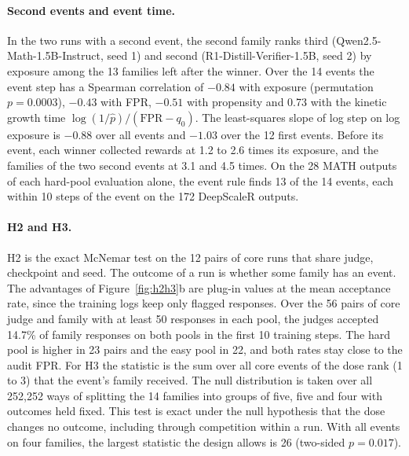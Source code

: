 \documentclass[11pt]{article}
\newcommand{\fpr}{\mathrm{FPR}}
\newcommand{\phat}{\hat{p}}
\begin{document}
\paragraph{Second events and event time.} In the two runs with a second event, the
second family ranks third (Qwen2.5-Math-1.5B-Instruct, seed 1) and second (R1-Distill-Verifier-1.5B, seed 2) by
exposure among the 13 families left after the winner. Over the 14 events the event step has a Spearman correlation of $-0.84$ with exposure
(permutation $p = 0.0003$), $-0.43$ with FPR, $-0.51$ with propensity and 0.73 with the kinetic growth time
$\log(1/\phat)/(\fpr - q_0)$. The least-squares slope of log step on log exposure is $-0.88$ over all events and
$-1.03$ over the 12 first events. Before its event, each winner collected rewards at 1.2 to 2.6 times its exposure, and the
families of the two second events at 3.1 and 4.5 times. On the 28
MATH outputs of each hard-pool evaluation alone, the event rule finds 13 of the 14 events, each within 10 steps of
the event on the 172 DeepScaleR outputs.

\paragraph{H2 and H3.} H2 is the exact McNemar test on the 12 pairs of core runs that share judge, checkpoint and seed.
The outcome of a run is whether some family has an event. The advantages of Figure~\ref{fig:h2h3}b are
plug-in values at the mean acceptance rate, since the training logs keep only flagged responses. Over the 56 pairs of core judge and
family with at least 50 responses in each pool, the judges accepted 14.7\% of family responses on both pools in the
first 10 training steps. The hard pool is higher in 23 pairs and the easy pool in 22, and both rates stay close to
the audit FPR. For H3 the statistic is the sum over all core events of
the dose rank (1 to 3) that the event's family received. The null distribution is taken over all 252,252 ways of splitting
the 14 families into groups of five, five and four with outcomes held fixed. This test is exact under the null
hypothesis that the dose changes no outcome, including through competition within a run. With all events on four
families, the largest statistic the design allows is 26 (two-sided $p = 0.017$).
\end{document}
